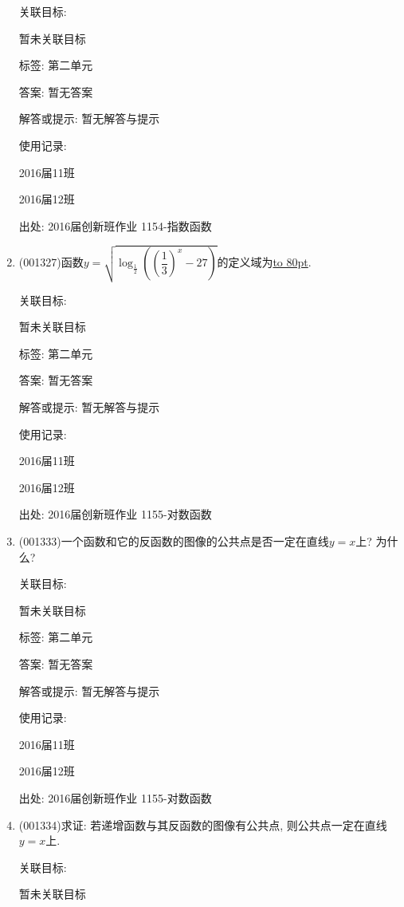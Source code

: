 \documentclass[10pt,a4paper]{article}
\newcommand{\blank}[1]{\underline{\hbox to #1pt{}}}
\begin{document}
\begin{enumerate}[1.]
关联目标:

暂未关联目标



标签: 第二单元

答案: 暂无答案

解答或提示: 暂无解答与提示

使用记录:

2016届11班			

2016届12班			


出处: 2016届创新班作业	1154-指数函数
\item { (001327)}函数$y=\sqrt{\log_{\frac{1}{2}}\left(\left(\dfrac{1}{3}\right)^x-27\right)}$的定义域为\blank{80}.


关联目标:

暂未关联目标



标签: 第二单元

答案: 暂无答案

解答或提示: 暂无解答与提示

使用记录:

2016届11班	

2016届12班	


出处: 2016届创新班作业	1155-对数函数
\item { (001333)}一个函数和它的反函数的图像的公共点是否一定在直线$y=x$上? 为什么?


关联目标:

暂未关联目标



标签: 第二单元

答案: 暂无答案

解答或提示: 暂无解答与提示

使用记录:

2016届11班	

2016届12班	


出处: 2016届创新班作业	1155-对数函数
\item { (001334)}求证: 若递增函数与其反函数的图像有公共点, 则公共点一定在直线$y=x$上.


关联目标:

暂未关联目标




\end{enumerate}
\end{document}
